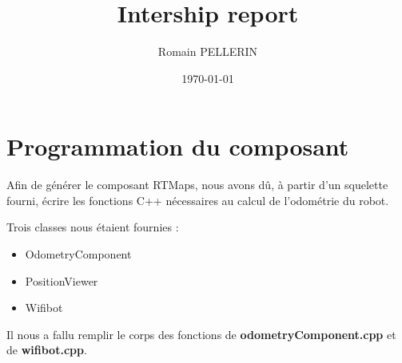 \documentclass[11pt,a4paper,oneside,french,svgnames]{report}
\title{Intership report}
\author{Romain PELLERIN}
\date\today
\begin{document}
\chapter{Programmation du composant}
Afin de générer le composant RTMaps, nous avons dû, à partir d’un squelette fourni, écrire les fonctions C++ nécessaires au calcul de l’odométrie du robot.

\medskip

\noindent Trois classes nous étaient fournies :
\begin{itemize}
  \item OdometryComponent
  \item PositionViewer
  \item Wifibot
\end{itemize}
Il nous a fallu remplir le corps des fonctions de \textbf{odometryComponent.cpp} et de \textbf{wifibot.cpp}.
\end{document}

